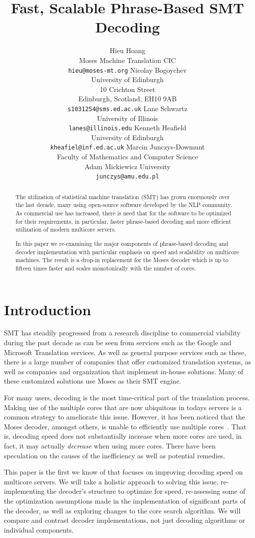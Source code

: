 \documentclass[11pt]{article}
\title{Fast, Scalable Phrase-Based SMT Decoding}
\author{Hieu Hoang\\
	    Moses Machine Translation CIC\\
	    {\tt hieu@moses-mt.org}
	  \And
	Nicolay Bogoychev\\
  	University of Edinburgh\\
  	10 Crichton Street\\
  	Edinburgh, Scotland, EH10 9AB\\
  {\tt s1031254@sms.ed.ac.uk}
	  \And
	Lane Schwartz\\
  	University of Illinois\\
  {\tt lanes@illinois.edu}
	  \AND
	Kenneth Heafield\\
  	University of Edinburgh\\
  {\tt kheafiel@inf.ed.ac.uk}
	  \And
	Marcin Junczys-Dowmunt\\
	Faculty of Mathematics and Computer Science \\
	Adam Mickiewicz University\\
  {\tt junczys@amu.edu.pl}
	}
\date{}
\begin{document}
\maketitle

\begin{abstract}
The utilization of statistical machine translation (SMT) has grown enormously over the last decade, many using open-source software developed by the NLP community. As commercial use has increased, there is need that for the software to be optimized for their requirements, in particular, faster phrase-based decoding and more efficient utilization of modern multicore servers.

In this paper we re-examining the major components of phrase-based decoding and decoder implementation with particular emphasis on speed and scalability on multicore machines. The result is a drop-in replacement for the Moses decoder which is up to fifteen times faster and scales monotonically with the number of cores. 

\end{abstract}

\section{Introduction}

SMT has steadily progressed from a research discipline to commercial viability during the past decade as can be seen from services such as the Google and Microsoft Translation services. As well as general purpose services such as these, there is a large number of companies that offer customized translation systems, as well as  companies and organization that implement in-house solutions. Many of these customized solutions use Moses as their SMT engine.

For many users, decoding is the most time-critical part of the translation process. Making use of the multiple cores that are now ubiquitous in todays servers is a common strategy to ameliorate this issue. However, it has been noticed that the Moses decoder, amongst others, is unable to efficiently use multiple cores~\cite{mfernandez2016boosting}. That is, decoding speed does not substantially increase when more cores are used, in fact, it may actually \emph{decrease} when using more cores. There have been speculation on the causes of the inefficiency as well as potential remedies. 

This paper is the first we know of that focuses on improving decoding speed on multicore servers. We will take a holistic approach to solving this issue, re-implementing the decoder's structure to optimize for speed, re-assessing some of the optimization assumptions made in the implementation of significant parts of the decoder, as well as exploring changes to the core search algorithm. We will compare and contrast decoder implementations, not just decoding algorithms or individual components. 
\end{document}

